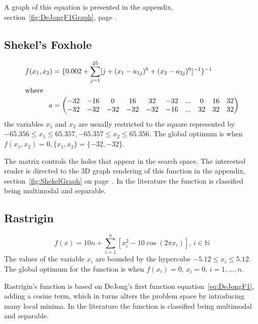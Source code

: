 A graph of this equation is presented in the appendix, section~\ref{fig:DeJongF1Graph}, page \pageref{fig:DeJongF1Graph}.
\subsection{Shekel's Foxhole}
\begin{align}
\label{eq:shekel}
	f(x_1,x_2) &= \{0.002 + \sum^{25}_{j=1} [j + (x_1 - a_{1j})^6 + (x_2 - a_{2j})^6]^{-1}\}^{-1}\\
\intertext{where}
	a &= \begin{pmatrix} \nonumber
			-32 & -16 & 0 & 16 & 32 & -32 & ... & 0 & 16 & 32 \\
			-32 & -32 & -32 & -32 & -32 & -16 & ... & 32 & 32 & 32 \\
		 \end{pmatrix}
\end{align}
the variables $x_1$ and $x_2$ are usually restricted to the square represented by $-65.356 \leq x_1 \leq 65.357, -65.357 \leq x_2 \leq 65.356$\cite{ABCCompareStudy,TSGlobalOptimization,ContinACSTS,TestFunctions}. The global optimum is when $f(x_1,x_2) = 0, \{x_1,x_2\} = \{-32,-32\}$\cite{ABCCompareStudy,TSGlobalOptimization,ContinACSTS,TestFunctions}.

The matrix controls the holes that appear in the search space. The interested reader is directed to the 3D graph rendering of this function in the appendix, section~\ref{fig:ShekelGraph} on page~\pageref{fig:ShekelGraph}. In the literature the function is classified being multimodal and separable\cite{adaptPSO,ABCCompareStudy,TestFunctions}.

\subsection{Rastrigin}
\begin{equation}
	f(x) = 10n + \sum_{i=1}^n [x_i^2 - 10\cos(2 \pi x_i)],\, i \in \mathbb{N}
\end{equation}
The values of the variable $x_i$ are bounded by the hypercube $-5.12 \leq x_i \leq 5.12$\cite{adaptPSO,ABCCompareStudy,numericalABC,ARPSO,PerfABC,HybridIntelliGA,TestFunctions}. The global optimum for the function is when $f(x_i) = 0,\, x_i = 0, \, i = 1,\dots,n$\cite{adaptPSO,ABCCompareStudy,numericalABC,HybridIntelliGA,TestFunctions}.

Rastrigin's function is based on DeJong's first function equation~\ref{eq:DeJongF1}, adding a cosine term, which in turns alters the problem space by introducing many local minima\cite{numericalABC,PerfABC,HybridIntelliGA,TestFunctions}. In the literature the function is classified being multimodal and separable\cite{adaptPSO,ABCCompareStudy,numericalABC,ARPSO,ChaoticABC,PerfABC,HybridIntelliGA,TestFunctions}.

